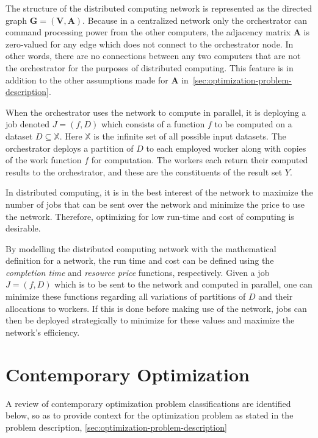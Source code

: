 \documentclass[../mthe-493-final-project.tex]{subfiles}
\begin{document}
    The structure of the distributed computing network is represented as the directed graph $\mathbf{G} = (\mathbf{V}, \mathbf{A})$. Because in a centralized network only the orchestrator can command processing power from the other computers, the adjacency matrix $\mathbf{A}$ is zero-valued for any edge which does not connect to the orchestrator node. In other words, there are no connections between any two computers that are not the orchestrator for the purposes of distributed computing. This feature is in addition to the other assumptions made for $\mathbf{A}$ in~\autoref{sec:optimization-problem-description}.

    When the orchestrator uses the network to compute in parallel, it is deploying a job denoted $J = (f,D)$ which consists of a function $f$ to be computed on a dataset $D \subseteq \mathbb{X}$. Here $\mathbb{X}$ is the infinite set of all possible input datasets. The orchestrator deploys a partition of $D$ to each employed worker along with copies of the work function $f$ for computation. The workers each return their computed results to the orchestrator, and these are the constituents of the result set $Y$.

    In distributed computing, it is in the best interest of the network to maximize the number of jobs that can be sent over the network and minimize the price to use the network. Therefore, optimizing for low run-time and cost of computing is desirable.

    By modelling the distributed computing network with the mathematical definition for a network, the run time and cost can be defined using the \textit{completion time} and \textit{resource price} functions, respectively. Given a job $J = (f,D)$ which is to be sent to the network and computed in parallel, one can minimize these functions regarding all variations of partitions of $D$ and their allocations to workers. If this is done before making use of the network, jobs can then be deployed strategically to minimize for these values and maximize the network's efficiency.
    
    \section{Contemporary Optimization}
    \label{sec:contemporary-optimization}

    A review of contemporary optimization problem classifications are identified below, so as to provide context for the optimization problem as stated in the problem description, \autoref{sec:optimization-problem-description}
\end{document}
